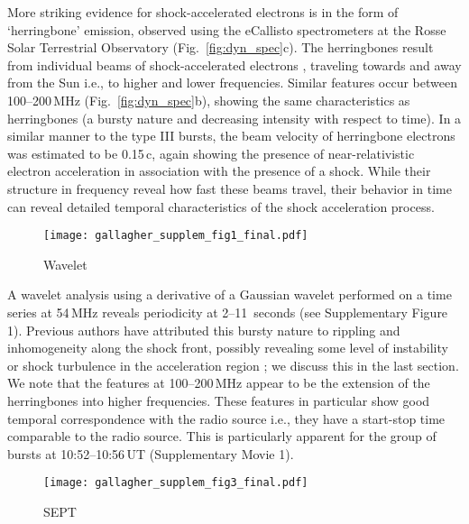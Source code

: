 More striking evidence for shock-accelerated electrons is in the form of `herringbone' emission, observed using the eCallisto spectrometers \citep{benz2009} at the Rosse Solar Terrestrial Observatory \citep[RSTO;][]{zucca2012} (Fig.~\ref{fig:dyn_spec}c). The herringbones result from individual beams of shock-accelerated electrons \citep{mann2005}, traveling towards and away from the Sun  i.e., to higher and lower frequencies. Similar features occur between 100--200\,MHz (Fig.~\ref{fig:dyn_spec}b), showing the same characteristics as herringbones (a bursty nature and decreasing intensity with respect to time). In a similar manner to the type III bursts, the beam velocity of herringbone electrons was estimated to be 0.15\,c, again showing the presence of near-relativistic electron acceleration in association with the presence of a shock. While their structure in frequency reveal how fast these beams travel, their behavior in time can reveal detailed temporal characteristics of the shock acceleration process.
\begin{figure}[!ht]
\begin{center}
\texttt{[image: gallagher\_supplem\_fig1\_final.pdf]}
\caption{Wavelet}
\label{wavelet}
\end{center}
\end{figure}
A wavelet analysis using a derivative of a Gaussian wavelet performed on a time series at 54\,MHz reveals periodicity at 2--11~seconds (see Supplementary Figure 1). Previous authors have attributed this bursty nature to rippling and inhomogeneity along the shock front, possibly revealing some level of instability or shock turbulence in the acceleration region \citep{burgess2006, guo2010}; we discuss this in the last section. We note that the features at 100--200\,MHz appear to be the extension of the herringbones into higher frequencies. These features in particular show good temporal correspondence with the radio source i.e., they have a start-stop time comparable to the radio source. This is particularly apparent for the group of bursts at 10:52--10:56\,UT (Supplementary Movie 1).
\begin{figure}[!t]
\begin{center}
\texttt{[image: gallagher\_supplem\_fig3\_final.pdf]}
\caption{SEPT}
\label{fig:sept}
\end{center}
\end{figure}
